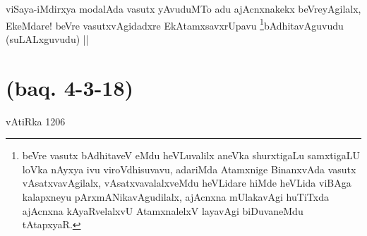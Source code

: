 
\begin{artha}
viSaya-iMdirxya modalAda vasutx yAvuduMTo adu ajAcnxnakekx beVreyAgilalx, EkeMdare! beVre vasutxvAgidadxre EkAtamxsavxrUpavu \footnote{beVre vasutx bAdhitaveV eMdu heVLuvalilx aneVka shurxtigaLu samxtigaLU loVka nAyxya ivu viroVdhisuvavu, adariMda Atamxnige BinanxvAda vasutx vAsatxvavAgilalx, vAsatxvavalalxveMdu heVLidare hiMde heVLida viBAga kalapxneyu pArxmANikavAgudilalx, ajAcnxna mUlakavAgi huTiTxda ajAcnxna kAyaRvelalxvU AtamxnalelxV layavAgi biDuvaneMdu tAtapxyaR.}bAdhitavAguvudu (suLALxguvudu) ||
\end{artha}

\section*{(baq. 4-3-18)} vAtiRka 1206

